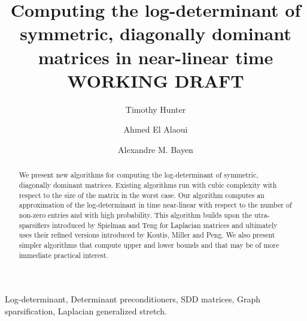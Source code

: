 \documentclass[11pt,onefignum,onetabnum]{siamltex}
\title{Computing the log-determinant of symmetric, diagonally dominant matrices
in near-linear time\\
WORKING DRAFT}
\author{Timothy Hunter \and Ahmed {El Alaoui} \and Alexandre M. Bayen}
\begin{document}
\maketitle

\begin{abstract}
We present new algorithms for computing the log-determinant of symmetric,
diagonally dominant matrices. Existing algorithms run with cubic complexity
with respect to the size of the matrix in the worst case. Our algorithm 
computes an approximation of the log-determinant in time near-linear with 
respect to the number of non-zero entries and with high probability. This 
algorithm builds upon the utra-sparsifiers introduced by Spielman and Teng for
Laplacian matrices and ultimately uses their refined versions introduced by Koutis, Miller and Peng. We also present simpler algorithms that compute upper and 
lower bounds and that may be of more immediate practical interest.
\end{abstract}

\begin{keywords}
Log-determinant,
Determinant preconditioners,
SDD matrices,
Graph sparsification,
Laplacian generalized stretch.
\end{keywords}

\begin{AMS}\end{AMS}


\pagestyle{myheadings}

\thispagestyle{plain}














% 

% 
\end{document}
